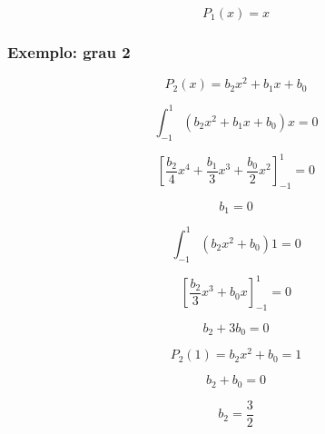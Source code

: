         \begin{equation*}
            P_1(x) = x 
        \end{equation*}


        \subsubsection*{Exemplo: grau 2}

        \begin{equation*}
            P_2(x) = b_2x^2 + b_1 x + b_0
        \end{equation*}

        \begin{equation*}
            \int_{-1}^{1} \left(b_2x^2 + b_1 x + b_0\right) x = 0
        \end{equation*}

        \begin{equation*}
            \left[ \frac{b_2}{4}x^4 + \frac{b_1}{3}x^3 + \frac{b_0}{2}x^2\right]_{-1}^1 = 0
        \end{equation*}

        \begin{equation*}
            b_1= 0
        \end{equation*}


        \begin{equation*}
            \int_{-1}^{1} \left(b_2x^2 + b_0\right) 1 = 0
        \end{equation*}

        \begin{equation*}
            \left[ \frac{b_2}{3}x^3 + b_0 x\right]_{-1}^1 = 0
        \end{equation*}

        \begin{equation*}
            b_2 + 3b_0= 0
        \end{equation*}


        \begin{equation*}
            P_2(1) = b_2x^2 + b_0 = 1
        \end{equation*}

        \begin{equation*}
            b_2 + b_0= 0
        \end{equation*}

        \begin{equation*}
            b_2= \frac{3}{2}
        \end{equation*}

